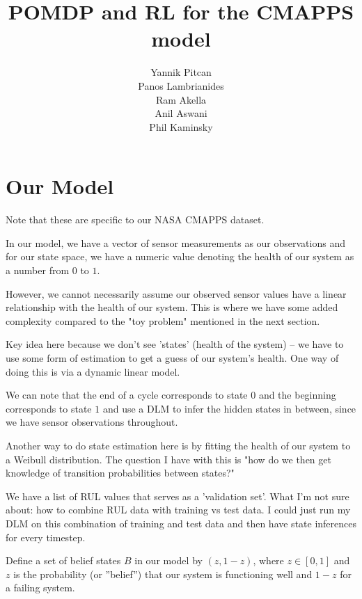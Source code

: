 \documentclass[english]{article}
\numberwithin{equation}{section}
\begin{document}
\title{POMDP and RL for the CMAPPS model}

\author{Yannik Pitcan \\
	Panos Lambrianides \\
	Ram Akella \\
	Anil Aswani \\
	Phil Kaminsky
}
\maketitle

\section{Our Model}
Note that these are specific to our NASA CMAPPS dataset.

In our model, we have a vector of sensor measurements as our observations and for our state space, we have a numeric value denoting the health of our system as a number from $0$ to $1$.

However, we cannot necessarily assume our observed sensor values have a linear relationship with the health of our system. This is where we have some added complexity compared to the "toy problem" mentioned in the next section.

Key idea here because we don't see 'states' (health of the system) -- we have to use some form of estimation to get a guess of our system's health. One way of doing this is via a dynamic linear model.

We can note that the end of a cycle corresponds to state $0$ and the beginning corresponds to state $1$ and use a DLM to infer the hidden states in between, since we have sensor observations throughout.

Another way to do state estimation here is by fitting the health of our system to a Weibull distribution. The question I have with this is "how do we then get knowledge of transition probabilities between states?"

We have a list of RUL values that serves as a 'validation set'. What I'm not sure about:
how to combine RUL data with training vs test data. I could just run my DLM on this combination of training and test data and then have state inferences for every timestep.

Define a set of belief states $B$ in our model by $(z,1-z)$, where $z\in [0,1]$ and $z$ is the probability (or ''belief'') that our system is functioning well and $1-z$ for a failing system.
\end{document}
